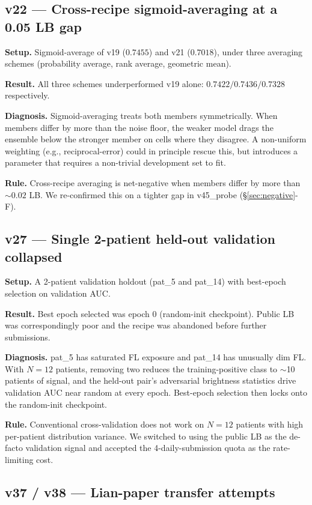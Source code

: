 \documentclass[conference]{IEEEtran}
\begin{document}
\subsection{v22 --- Cross-recipe sigmoid-averaging at a 0.05 LB gap}

\textbf{Setup.} Sigmoid-average of v19 ($0.7455$) and v21 ($0.7018$), under three averaging schemes (probability average, rank average, geometric mean).

\textbf{Result.} All three schemes underperformed v19 alone: $0.7422 / 0.7436 / 0.7328$ respectively.

\textbf{Diagnosis.} Sigmoid-averaging treats both members symmetrically. When members differ by more than the noise floor, the weaker model drags the ensemble below the stronger member on cells where they disagree. A non-uniform weighting (e.g., reciprocal-error) could in principle rescue this, but introduces a parameter that requires a non-trivial development set to fit.

\textbf{Rule.} Cross-recipe averaging is net-negative when members differ by more than $\sim$$0.02$ LB. We re-confirmed this on a tighter gap in v45\_probe (\S\ref{sec:negative}-F).

\subsection{v27 --- Single 2-patient held-out validation collapsed}

\textbf{Setup.} A 2-patient validation holdout (pat\_5 and pat\_14) with best-epoch selection on validation AUC.

\textbf{Result.} Best epoch selected was epoch 0 (random-init checkpoint). Public LB was correspondingly poor and the recipe was abandoned before further submissions.

\textbf{Diagnosis.} pat\_5 has saturated FL exposure and pat\_14 has unusually dim FL. With $N=12$ patients, removing two reduces the training-positive class to $\sim$10 patients of signal, and the held-out pair's adversarial brightness statistics drive validation AUC near random at every epoch. Best-epoch selection then locks onto the random-init checkpoint.

\textbf{Rule.} Conventional cross-validation does not work on $N=12$ patients with high per-patient distribution variance. We switched to using the public LB as the de-facto validation signal and accepted the 4-daily-submission quota as the rate-limiting cost.

\subsection{v37 / v38 --- Lian-paper transfer attempts}
\end{document}

